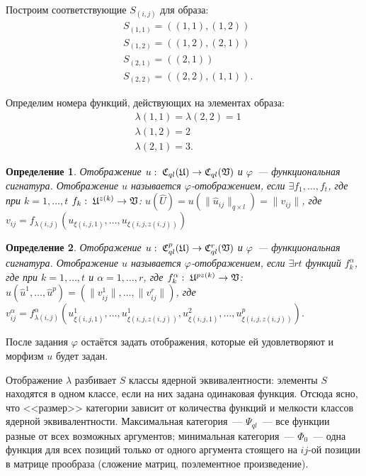\documentclass[a4paper, 12pt]{report}
\newtheorem{definition}{Определение}[chapter]
\begin{document}
Построим соответствующие $S_{(i,j)}$ для образа:
\begin{equation*}
\begin{split}
& S_{(1,1)} = ((1, 1), (1, 2)) \\
& S_{(1, 2)} = ((1, 2), (2, 1)) \\
& S_{(2, 1)} = ((2, 1)) \\
& S_{(2, 2)} = ((2, 2), (1, 1)).
\end{split}
\end{equation*}
 
Определим номера функций, действующих на элементах образа:
\begin{equation*}
\begin{split}
& \lambda(1, 1) = \lambda(2, 2) = 1 \\
& \lambda(1, 2) = 2 \\
& \lambda(2, 1) = 3.
\end{split}
\end{equation*}

\begin{definition}
Отображение $u: \; \mathfrak{C}_{ql}(\mathfrak{U}) \rightarrow \mathfrak{C}_{ql}(\mathfrak{V})$ и $\varphi$~--- функциональная сигнатура. Отображение $u$ называется $\varphi$-отображением, если $\exists f_1, \ldots, f_t$, где при $k = 1, \ldots, t$ $f_k: \; \mathfrak{U}^{z(k)} \rightarrow \mathfrak{V}$: $u(\hat{U}) = u(\| \hat{u}_{ij} \|_{q \times l}) = \| v_{ij} \|$, где $v_{ij} = f_{\lambda(i,j)}(u_{\xi(i,j,1)}, \ldots, u_{\xi(i,j,z(i, j))})$ 
\end{definition}

\begin{definition}
Отображение $u: \; \mathfrak{C}_{ql}^p(\mathfrak{U}) \rightarrow \mathfrak{C}_{ql}^r(\mathfrak{V})$ и $\varphi$~--- функциональная сигнатура. Отображение $u$ называется $\varphi$-отображением, если $\exists rt$ функций $f^{\alpha}_k$, где при $k = 1, \ldots, t$ и $\alpha = 1, \ldots, r$, где $f^{\alpha}_k: \; \mathfrak{U}^{pz(k)} \rightarrow \mathfrak{V}$: $u(\hat{u}^1, \ldots, \hat{u}^p) = (\| v^1_{ij}\|, \ldots, \| v^r_{ij} \|)$, где $v^{\alpha}_{ij} = f^{\alpha}_{\lambda(i,j)}(u^1_{\xi(i,j,1)}, \ldots, u^1_{\xi(i,j,z(i,j))}, u^2_{\xi(i,j,1)}, \ldots, u^p_{\xi(i,j,z(i, j))})$.
\end{definition}

После задания $\varphi$ остаётся задать отображения, которые ей удовлетворяют и морфизм $u$ будет задан.

Отображение $\lambda$ разбивает $S$ классы ядерной эквивалентности: элементы $S$ находятся в одном классе, если на них задана одинаковая функция. Отсюда ясно, что <<размер>> категории зависит от количества функций и мелкости классов ядерной эквивалентности. Максимальная категория~--- $\Psi_{ql}$~--- все функции разные от всех возможных аргументов; минимальная категория~--- $\Phi_0$~--- одна функция для всех позиций только от одного аргумента стоящего на $ij$-ой позиции в матрице прообраза (сложение матриц, поэлементное произведение). 
\end{document}
